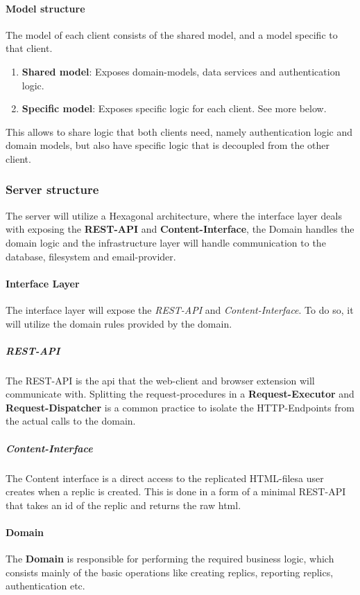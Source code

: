 \paragraph{Model structure}
The model of each client consists of the shared model, and a model specific to that client.
\begin{enumerate}
    \item \textbf{Shared model}: Exposes domain-models, data services and authentication logic.
    \item \textbf{Specific model}: Exposes specific logic for each client.
    See more below.
\end{enumerate}
This allows to share logic that both clients need, namely authentication logic and domain models, but also have specific logic that is decoupled from the other client.

\subsubsection{Server structure}
The server will utilize a Hexagonal architecture, where the interface layer deals with exposing the \textbf{REST-API} and \textbf{Content-Interface}, the Domain handles the domain logic and the infrastructure layer will handle communication to the database, filesystem and email-provider.

\paragraph{Interface Layer}
The interface layer will expose the \textit{REST-API} and \textit{Content-Interface}.
To do so, it will utilize the domain rules provided by the domain.

\subparagraph{REST-API}
The REST-API is the api that the web-client and browser extension will communicate with.
Splitting the request-procedures in a \textbf{Request-Executor} and \textbf{Request-Dispatcher} is a common practice to isolate the HTTP-Endpoints from the actual calls to the domain.

\subparagraph{Content-Interface}
The Content interface is a direct access to the replicated HTML-filesa user creates when a replic is created.
This is done in a form of a minimal REST-API that takes an id of the replic and returns the raw html.

\paragraph{Domain}
The \textbf{Domain} is responsible for performing the required business logic, which consists mainly of the basic operations like creating replics, reporting replics, authentication etc.

